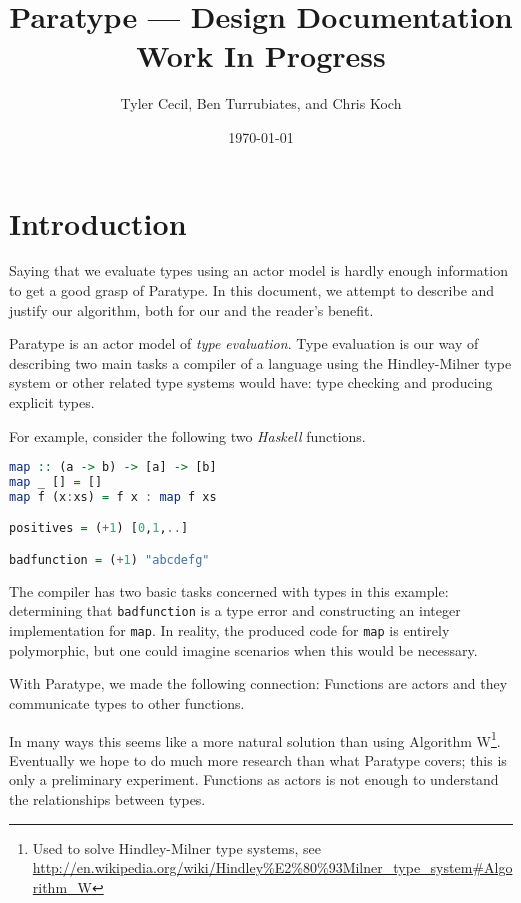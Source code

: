 \documentclass[10pt]{article}
\begin{document}
\renewcommand{\listofalgorithms}{\begingroup
	\tocfile{List of Algorithms}{loa}
	\endgroup
}
\makeatletter
\let\l@algorithm\l@figure
\makeatother
{}


\title{Paratype --- Design Documentation\\
Work In Progress}
\author{Tyler Cecil, Ben Turrubiates, and Chris Koch}
\date{\today}
\maketitle

\tableofcontents
\listofalgorithms

\pagebreak
\setcounter{page}{0}

\section{Introduction}
Saying that we evaluate types using an actor model is hardly enough information
to get a good grasp of Paratype. In this document, we attempt to
describe and justify our algorithm, both for our and the reader's benefit.

Paratype is an actor model of \emph{type evaluation}. Type evaluation is our
way of describing two main tasks a compiler of a language using the
Hindley-Milner type system or other related type systems would have: type
checking and producing explicit types.

For example, consider the following two \emph{Haskell} functions.
\begin{lstlisting}[language=Haskell,caption=Haskell example,label=lst:haskell]
map :: (a -> b) -> [a] -> [b]
map _ [] = []
map f (x:xs) = f x : map f xs

positives = (+1) [0,1,..]

badfunction = (+1) "abcdefg"
\end{lstlisting}

The compiler has two basic tasks concerned with types in this example:
determining that \lstinline!badfunction! is a type error and constructing an
integer implementation for \lstinline!map!. In reality, the produced code for
\lstinline!map! is entirely polymorphic, but one could imagine scenarios when
this would be necessary.

With Paratype, we made the following connection: Functions are actors and they
communicate types to other functions.

In many ways this seems like a more natural solution than using Algorithm
W\footnote{Used to solve Hindley-Milner type systems, see
	\url{http://en.wikipedia.org/wiki/Hindley\%E2\%80\%93Milner_type_system\#Algorithm_W}}. 
Eventually we hope to do much more
research than what Paratype covers; this is only a preliminary experiment.
Functions as actors is not enough to understand the relationships between
types.
\end{document}
